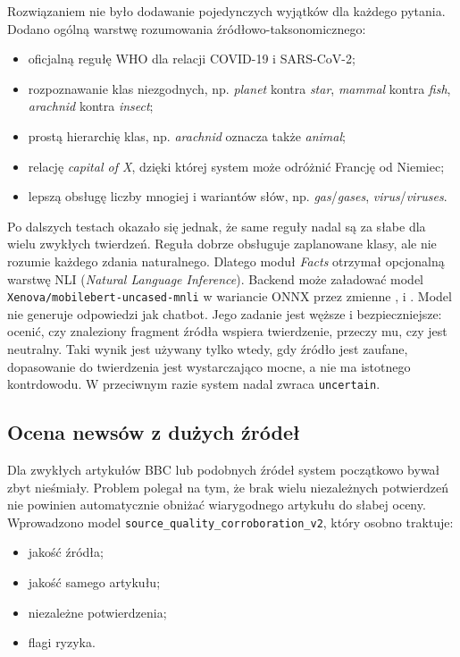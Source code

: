 \documentclass[12pt,a4paper]{article}
\begin{document}
Rozwiązaniem nie było dodawanie pojedynczych wyjątków dla każdego pytania.
Dodano ogólną warstwę rozumowania źródłowo-taksonomicznego:
\begin{itemize}
  \item oficjalną regułę WHO dla relacji COVID-19 i SARS-CoV-2;
  \item rozpoznawanie klas niezgodnych, np. \textit{planet} kontra \textit{star}, \textit{mammal} kontra \textit{fish}, \textit{arachnid} kontra \textit{insect};
  \item prostą hierarchię klas, np. \textit{arachnid} oznacza także \textit{animal};
  \item relację \textit{capital of X}, dzięki której system może odróżnić Francję od Niemiec;
  \item lepszą obsługę liczby mnogiej i wariantów słów, np. \textit{gas}/\textit{gases}, \textit{virus}/\textit{viruses}.
\end{itemize}

Po dalszych testach okazało się jednak, że same reguły nadal są za słabe dla wielu zwykłych twierdzeń.
Reguła dobrze obsługuje zaplanowane klasy, ale nie rozumie każdego zdania naturalnego.
Dlatego moduł \textit{Facts} otrzymał opcjonalną warstwę NLI (\textit{Natural Language Inference}).
Backend może załadować model \texttt{Xenova/mobilebert-uncased-mnli} w wariancie ONNX przez zmienne ,  i .
Model nie generuje odpowiedzi jak chatbot.
Jego zadanie jest węższe i bezpieczniejsze: ocenić, czy znaleziony fragment źródła wspiera twierdzenie, przeczy mu, czy jest neutralny.
Taki wynik jest używany tylko wtedy, gdy źródło jest zaufane, dopasowanie do twierdzenia jest wystarczająco mocne, a nie ma istotnego kontrdowodu.
W przeciwnym razie system nadal zwraca \texttt{uncertain}.

\subsection{Ocena newsów z dużych źródeł}
Dla zwykłych artykułów BBC lub podobnych źródeł system początkowo bywał zbyt nieśmiały.
Problem polegał na tym, że brak wielu niezależnych potwierdzeń nie powinien automatycznie obniżać wiarygodnego artykułu do słabej oceny.
Wprowadzono model \texttt{source\_quality\_corroboration\_v2}, który osobno traktuje:
\begin{itemize}
  \item jakość źródła;
  \item jakość samego artykułu;
  \item niezależne potwierdzenia;
  \item flagi ryzyka.
\end{itemize}
\end{document}
